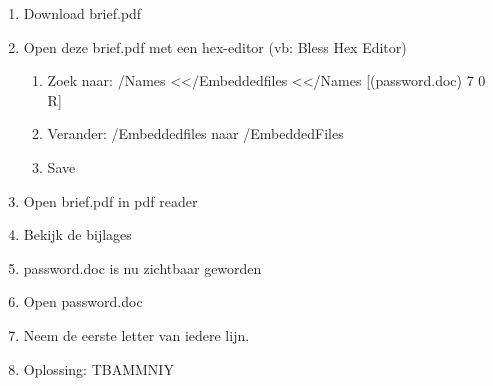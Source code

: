 \begin{enumerate}
  \item Download brief.pdf
  \item Open deze brief.pdf met een hex-editor (vb: Bless Hex Editor)
  \begin{enumerate}
  \item Zoek naar: /Names \textless\textless /Embeddedfiles \textless\textless /Names [(password.doc) 7 0 R]
  \item Verander: /Embeddedfiles naar /EmbeddedFiles
  \item Save
  \end{enumerate}
  \item Open brief.pdf in pdf reader
  \item Bekijk de bijlages
  \item password.doc is nu zichtbaar geworden
  \item Open password.doc
  \item Neem de eerste letter van iedere lijn.
  \item Oplossing: TBAMMNIY
\end{enumerate}